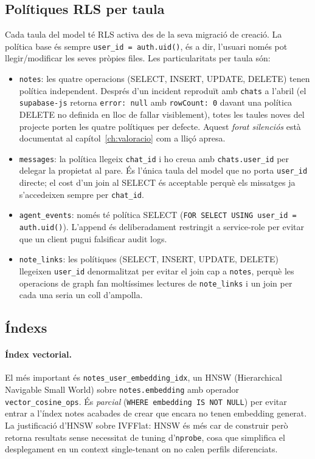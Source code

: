 \subsection{Polítiques RLS per taula}

Cada taula del model té RLS activa des de la seva migració de creació. La política base és sempre \texttt{user\_id = auth.uid()}, és a dir, l'usuari només pot llegir/modificar les seves pròpies files. Les particularitats per taula són:

\begin{itemize}
    \item \texttt{notes}: les quatre operacions (SELECT, INSERT, UPDATE, DELETE) tenen política independent. Després d'un incident reproduït amb \texttt{chats} a l'abril (el \texttt{supabase-js} retorna \texttt{error: null} amb \texttt{rowCount: 0} davant una política DELETE no definida en lloc de fallar visiblement), totes les taules noves del projecte porten les quatre polítiques per defecte. Aquest \emph{forat silenciós} està documentat al capítol~\ref{ch:valoracio} com a lliçó apresa.
    \item \texttt{messages}: la política llegeix \texttt{chat\_id} i ho creua amb \texttt{chats.user\_id} per delegar la propietat al pare. És l'única taula del model que no porta \texttt{user\_id} directe; el cost d'un join al SELECT és acceptable perquè els missatges ja s'accedeixen sempre per \texttt{chat\_id}.
    \item \texttt{agent\_events}: només té política SELECT (\texttt{FOR SELECT USING user\_id = auth.uid()}). L'append és deliberadament restringit a service-role per evitar que un client pugui falsificar audit logs.
    \item \texttt{note\_links}: les polítiques (SELECT, INSERT, UPDATE, DELETE) llegeixen \texttt{user\_id} denormalitzat per evitar el join cap a \texttt{notes}, perquè les operacions de graph fan moltíssimes lectures de \texttt{note\_links} i un join per cada una seria un coll d'ampolla.
\end{itemize}

\subsection{Índexs}

\paragraph{Índex vectorial.} El més important és \texttt{notes\_user\_embedding\_idx}, un HNSW (Hierarchical Navigable Small World) sobre \texttt{notes.embedding} amb operador \texttt{vector\_cosine\_ops}. És \emph{parcial} (\texttt{WHERE embedding IS NOT NULL}) per evitar entrar a l'índex notes acabades de crear que encara no tenen embedding generat. La justificació d'HNSW sobre IVFFlat: HNSW és més car de construir però retorna resultats sense necessitat de tuning d'\texttt{nprobe}, cosa que simplifica el desplegament en un context single-tenant on no calen perfils diferenciats.

